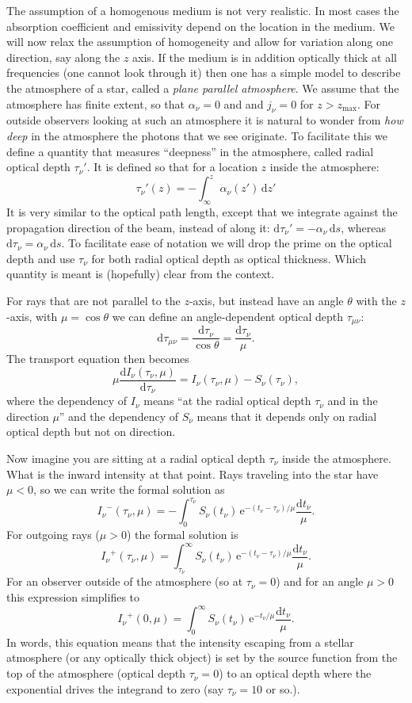 \documentclass[12pt]{article}
\numberwithin{equation}{section}
\def\exp{\mathrm{e}}
\def\dd{\mathrm{d}}
\def\Inu{\ensuremath{I_{\nu}}}
\def\jnu{\ensuremath{j_{\nu}}}
\def\Snu{\ensuremath{S_{\nu}}}
\def\anu{\ensuremath{\alpha_{\nu}}}
\def\taunu{\ensuremath{\tau_{\nu}}}
\def\taumunu{\ensuremath{\tau_{\mu\nu}}}
\def\ds{\ensuremath{\dd s}}
\newcommand{\be}{\begin{equation}}
\newcommand{\ee}{\end{equation}}
\begin{document}
The assumption of a homogenous medium is not very realistic. In most cases the absorption coefficient and emissivity depend on the location in the medium. We will now relax the assumption of homogeneity and allow for variation along one direction, say along the $z$ axis. If the medium is in addition optically thick at all frequencies (one cannot look through it) then one has a simple model to describe the atmosphere of a star, called a {\it plane parallel atmosphere}. We assume that the atmosphere has finite extent, so that $\anu=0$ and  and $\jnu=0$ for $z>z_\mathrm{max}$. For outside observers looking at such an atmosphere it is natural to wonder from {\it how deep} in the atmosphere the photons that we see originate. To facilitate this we define a quantity that measures ``deepness'' in the atmosphere, called radial optical depth $\taunu'$. It is defined so that for a location $z$ inside the atmosphere: 
\be
\taunu'(z) = -\int_\infty^z \anu(z') \, \dd z'
\ee
It is very similar to the optical path length, except that we integrate against the propagation direction of the beam, instead of along it: $\dd \taunu' = - \anu \, \ds$, whereas $\dd \taunu = \anu \, \ds$. To facilitate ease of notation we will drop the prime on the optical depth and use $\taunu$ for both radial optical depth as optical thickness. Which quantity is meant is (hopefully) clear from the context.

For rays that are not parallel to the $z$-axis, but instead have an angle $\theta$ with the $z$-axis, with $\mu = \cos{\theta}$ we can define an angle-dependent optical depth $\taumunu$:
\be
\dd \taumunu = \frac{\dd \taunu}{\cos \theta} = \frac{\dd \taunu}{\mu}.
\ee
The transport equation then becomes
\be
\mu \frac{\dd \Inu(\taunu,\mu)}{\dd \tau_\nu} = \Inu(\taunu,\mu) - \Snu(\taunu),
\ee 
where the dependency of $\Inu$ means ``at the radial optical depth $\taunu$ and in the direction $\mu$'' and the dependency of $\Snu$ means that it depends only on radial optical depth but not on direction.

Now imagine you are sitting at a radial optical depth $\taunu$ inside the atmosphere. What is the inward intensity at that point. Rays traveling into the star have $\mu<0$, so we can write the formal solution as 
\be
\Inu^-(\taunu,\mu)  =  - \int_0^{\taunu} \Snu(t_\nu) \, \exp^{-(t_\nu-\taunu)/\mu} \frac{\dd t_\nu}{\mu}.
\ee
For outgoing rays ($\mu>0$) the formal solution is
\be
\Inu^+(\taunu,\mu)  =   \int_{\taunu}^{\infty} \Snu(t_\nu) \, \exp^{-(t_\nu-\taunu)/\mu} \frac{\dd t_\nu}{\mu}.
\ee
For an observer outside of the atmosphere (so at $\taunu=0$) and for an angle $\mu>0$ this expression simplifies to
\be
 \label{eq:escrad}
\Inu^+(0,\mu)  =   \int_0^{\infty} \Snu(t_\nu) \, \exp^{-t_\nu/\mu} \frac{\dd t_\nu}{\mu}. 
\ee
In words, this equation means that the intensity escaping from a stellar atmosphere (or any optically thick object) is set by the source function from the top of the atmosphere (optical depth $\taunu=0$) to an optical depth where the exponential drives the integrand to zero (say $\taunu=10$ or so.).
\end{document}
